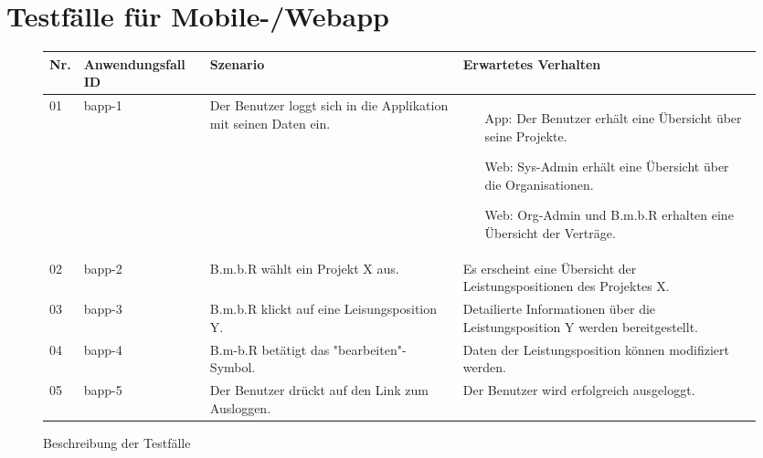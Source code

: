 
\section{Testfälle für Mobile-/Webapp}
\begin{figure}[!h]
	\begin{center}
		\begin{tabularx}{\textwidth}{ p{} | p{} | p{} | X }
			\textbf{Nr.} & \textbf{Anwendungsfall ID} & \textbf{Szenario} & \textbf{Erwartetes Verhalten} \\ \hline
			01 & bapp-1 & Der Benutzer loggt sich in die Applikation mit seinen Daten ein. & 
			\begin{itemize}
				\item[App:] Der Benutzer erhält eine Übersicht über seine Projekte.
				\item[Web:] Sys-Admin erhält eine Übersicht über die Organisationen.
				\item[Web:] Org-Admin und B.m.b.R erhalten eine Übersicht der Verträge.
			\end{itemize} \\ \hline
			02 & bapp-2 & B.m.b.R wählt ein Projekt X aus. & Es erscheint eine Übersicht der Leistungspositionen des Projektes X. \\ \hline
			03 & bapp-3 & B.m.b.R klickt auf eine Leisungsposition Y. & Detailierte Informationen über die Leistungsposition Y werden bereitgestellt. \\ \hline
			04 & bapp-4 & B.m-b.R betätigt das "bearbeiten"-Symbol. & Daten der Leistungsposition können modifiziert werden. \\ \hline
			05 & bapp-5 & Der Benutzer drückt auf den Link zum Ausloggen. & Der Benutzer wird erfolgreich ausgeloggt. \\ \hline
		\end{tabularx}	
	\end{center}
	\caption{Beschreibung der Testfälle}
	\label{fig:testfaelle-beide-anwendungen-tabelle}
\end{figure}


